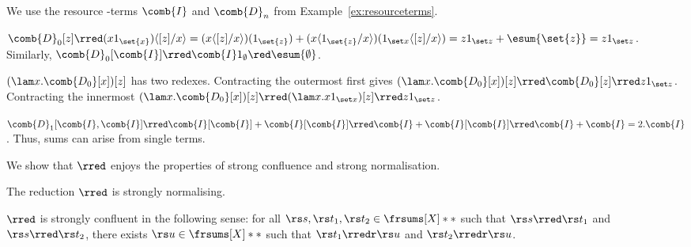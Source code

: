 \begin{example} We use the resource \lamI-terms $\comb{I}$ and $\comb{D}_n$ from Example~\ref{ex:resourceterms}.
\bsub
\item $\comb{D}_0[z]\rred (x1_{\set{x}})\langle[z]/x\rangle = 
	(x\langle[z]/x\rangle)(1_{\set{z}}) + (x\langle1_{\set{z}}/x\rangle)(1_{\set x}\langle [z]/x\rangle) = z1_{\set z}+\esum{\set{z}} = z1_{\set z}$. 
	Similarly, $\comb{D}_0[\comb{I}] \rred \comb{I}1_{\emptyset} 
	\red \esum{\emptyset}$.
\item $(\lam x.\comb{D_0}[x])[z]$ has two redexes. Contracting the outermost first gives $(\lam x.\comb{D_0}[x])[z]\rred \comb{D_0}[z]\rred z1_{\set z}$.
Contracting the innermost $(\lam x.\comb{D_0}[x])[z]\rred (\lam x.x1_{\set x})[z]\rred z1_{\set z}$.
\item $\comb{D}_1[\comb{I},\comb{I}]\rred \comb{I}[\comb{I}] + \comb{I}[\comb{I}]\rred \comb{I}+ \comb{I}[\comb{I}]\rred \comb{I}+\comb{I} = 2.\comb{I}$. 
Thus, sums can arise from single terms.
\esub
\end{example}

We show that $\rred$ enjoys the properties of strong confluence and strong normalisation.

\setcounter{the:rred-norm-confl:confl}{\thetheorem}
\begin{theorem} \label{the:rred-norm-confl}\mbox{}
\bsub
\item The reduction $\rred$ is strongly normalising.
	\label{the:rred-norm-confl:norm}
\item $\rred$ is strongly confluent in the following sense:
	for all $\rs s, \rs t_1, \rs t_2 \in \frsums[X]**$
	such that $\rs s \rred \rs t_1$ and $\rs s \rred \rs t_2$,
	there exists $\rs u \in \frsums[X]**$ such that
	$\rs t_1 \rredr \rs u$ and $\rs t_2 \rredr \rs u$.
	\label{the:rred-norm-confl:confl}
\esub 
\end{theorem}

